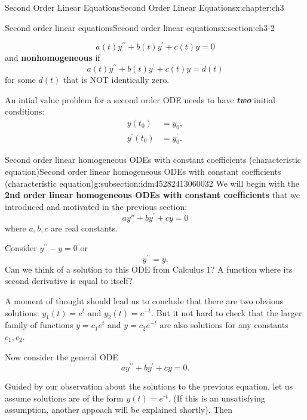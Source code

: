 \documentclass[oneside,10pt,]{book}
\newcommand{\alert}[1]{\textbf{\textit{#1}}}
\newcommand{\terminology}[1]{\textbf{#1}}
\numberwithin{equation}{section}
\numberwithin{equation}{section}
\newcommand{\amp}{&}
\begin{document}
\begin{chapterptx}{Second Order Linear Equations}{}{Second Order Linear Equations}{}{}{x:chapter:ch3}
\begin{sectionptx}{Second order linear equations}{}{Second order linear equations}{}{}{x:section:ch3-2}
\begin{introduction}{}
\begin{equation*}
a(t)y^{\prime\prime}+b(t)y^{\prime}+c(t)y=0
\end{equation*}
and \terminology{nonhomogeneous} if%
\begin{equation*}
a(t)y^{\prime\prime}+b(t)y^{\prime}+c(t)y=d(t)
\end{equation*}
for some \(d(t)\) that is NOT identically zero.%
\par
An intial value problem for a second order ODE needs to have \alert{two} initial conditions:%
\begin{align*}
y(t_{0}) \amp =y_{0},\\
y^{\prime}(t_{0}) \amp =y_{0}^{\prime}.
\end{align*}
%
\end{introduction}%
%
%
\typeout{************************************************}
\typeout{************************************************}
%
\begin{subsectionptx}{Second order linear homogeneous ODEs with constant coefficients (characteristic equation)}{}{Second order linear homogeneous ODEs with constant coefficients (characteristic equation)}{}{}{g:subsection:idm45282413060032}
We will begin with the \terminology{2nd order linear homogeneous ODEs with constant coefficients} that we introduced and motivated in the previous section:%
\begin{equation*}
ay''+by^{\prime}+cy=0
\end{equation*}
where \(a,b,c\) are real constants.%
\par
Consider \(y^{\prime\prime}-y=0\) or%
\begin{equation*}
y^{\prime\prime}=y.
\end{equation*}
Can we think of a solution to this ODE from Calculus 1? A function where its second derivative is equal to itself?%
\par
A moment of thought should lead us to conclude that there are two obvious solutions: \(y_{1}(t)=e^{t}\) and \(y_{2}(t)=e^{-t}\). But it not hard to check that the larger family of functions \(y = c_{1}e^{t}\) and \(y = c_{2}e^{-t}\) are also solutions for any constants \(c_1, c_2\).%
\par
Now consider the general ODE%
\begin{equation*}
ay^{\prime\prime}+by^{\prime}+cy=0.
\end{equation*}
%
\par
Guided by our observation about the solutions to the previous equation, let us assume solutions are of the form \(y(t)=e^{rt}\). (If this is an unsatisfying assumption, another appoach will be explained shortly).  Then%

\end{subsectionptx}
\end{sectionptx}
\end{chapterptx}
\end{document}
